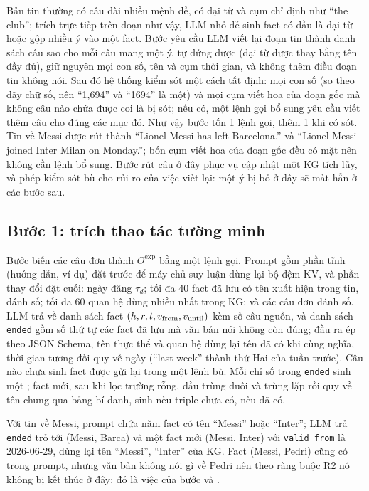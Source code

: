 Bản tin thường có câu dài nhiều mệnh đề, có đại từ và cụm chỉ định như ``the club''; trích trực tiếp trên đoạn như vậy, LLM nhỏ dễ sinh fact có đầu là đại từ hoặc gộp nhiều ý vào một fact.
Bước  yêu cầu LLM viết lại đoạn tin thành danh sách câu sao cho mỗi câu mang một ý, tự đứng được (đại từ được thay bằng tên đầy đủ), giữ nguyên mọi con số, tên và cụm thời gian, và không thêm điều đoạn tin không nói.
Sau đó hệ thống kiểm sót một cách tất định: mọi con số (so theo dãy chữ số, nên ``1,694'' và ``1694'' là một) và mọi cụm viết hoa của đoạn gốc mà không câu nào chứa được coi là bị sót; nếu có, một lệnh gọi bổ sung yêu cầu viết thêm câu cho đúng các mục đó.
Như vậy bước  tốn 1 lệnh gọi, thêm 1 khi có sót.
Tin về Messi được rút thành ``Lionel Messi has left Barcelona.'' và ``Lionel Messi joined Inter Milan on Monday.''; bốn cụm viết hoa của đoạn gốc đều có mặt nên không cần lệnh bổ sung.
Bước rút câu ở đây phục vụ cập nhật một KG tích lũy, và phép kiểm sót bù cho rủi ro của việc viết lại: một ý bị bỏ ở đây sẽ mất hẳn ở các bước sau.

\subsection{Bước 1: trích thao tác tường minh}\label{sec:step-extract}

Bước  biến các câu đơn thành $O^{\mathrm{exp}}$ bằng một lệnh gọi.
Prompt gồm phần tĩnh (hướng dẫn, ví dụ) đặt trước để máy chủ suy luận dùng lại bộ đệm KV, và phần thay đổi đặt cuối: ngày đăng $\tau_d$; tối đa 40 fact đã lưu có tên xuất hiện trong tin, đánh số; tối đa 60 quan hệ dùng nhiều nhất trong KG; và các câu đơn đánh số.
LLM trả về danh sách fact $(h,r,t,v_{\mathrm{from}},v_{\mathrm{until}})$ kèm số câu nguồn, và danh sách \texttt{ended} gồm số thứ tự các fact đã lưu mà văn bản nói không còn đúng; đầu ra ép theo JSON Schema, tên thực thể và quan hệ dùng lại tên đã có khi cùng nghĩa, thời gian tương đối quy về ngày (``last week'' thành thứ Hai của tuần trước).
Câu nào chưa sinh fact được gửi lại trong một lệnh bù.
Mỗi chỉ số trong \texttt{ended} sinh một ; fact mới, sau khi lọc trường rỗng, đầu trùng đuôi và trùng lặp rồi quy về tên chung qua bảng bí danh, sinh  nếu triple chưa có,  nếu đã có.

Với tin về Messi, prompt chứa năm fact có tên ``Messi'' hoặc ``Inter''; LLM trả \texttt{ended} trỏ tới (Messi, Barca) và một fact mới (Messi, Inter) với \texttt{valid\_from} là 2026-06-29, dùng lại tên ``Messi'', ``Inter'' của KG.
Fact (Messi, Pedri) cũng có trong prompt, nhưng văn bản không nói gì về Pedri nên theo ràng buộc R2 nó không bị kết thúc ở đây; đó là việc của bước  và .

